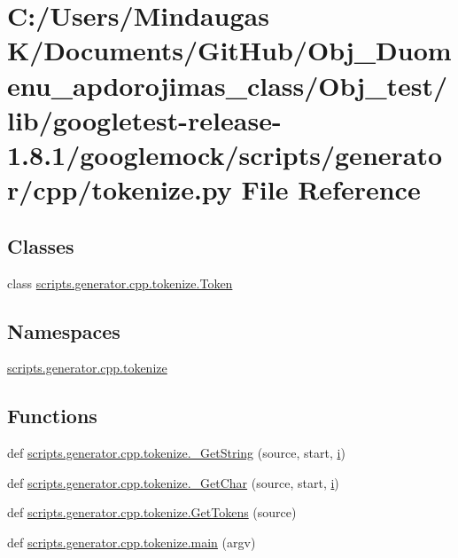 \hypertarget{_obj__test_2lib_2googletest-release-1_88_81_2googlemock_2scripts_2generator_2cpp_2tokenize_8py}{}\section{C\+:/\+Users/\+Mindaugas K/\+Documents/\+Git\+Hub/\+Obj\+\_\+\+Duomenu\+\_\+apdorojimas\+\_\+class/\+Obj\+\_\+test/lib/googletest-\/release-\/1.8.1/googlemock/scripts/generator/cpp/tokenize.py File Reference}
\label{_obj__test_2lib_2googletest-release-1_88_81_2googlemock_2scripts_2generator_2cpp_2tokenize_8py}
\subsection*{Classes}
\begin{DoxyCompactItemize}
\item 
class \mbox{\hyperlink{classscripts_1_1generator_1_1cpp_1_1tokenize_1_1_token}{scripts.\+generator.\+cpp.\+tokenize.\+Token}}
\end{DoxyCompactItemize}
\subsection*{Namespaces}
\begin{DoxyCompactItemize}
\item 
 \mbox{\hyperlink{namespacescripts_1_1generator_1_1cpp_1_1tokenize}{scripts.\+generator.\+cpp.\+tokenize}}
\end{DoxyCompactItemize}
\subsection*{Functions}
\begin{DoxyCompactItemize}
\item 
def \mbox{\hyperlink{namespacescripts_1_1generator_1_1cpp_1_1tokenize_a2fdc7cdc1c5bf1b4ac06a620b56da9a0}{scripts.\+generator.\+cpp.\+tokenize.\+\_\+\+Get\+String}} (source, start, \mbox{\hyperlink{_obj__test_2lib_2googletest-master_2googlemock_2test_2gmock-matchers__test_8cc_acb559820d9ca11295b4500f179ef6392}{i}})
\item 
def \mbox{\hyperlink{namespacescripts_1_1generator_1_1cpp_1_1tokenize_af68b9aec67dcebb9b919b7ec8a230d78}{scripts.\+generator.\+cpp.\+tokenize.\+\_\+\+Get\+Char}} (source, start, \mbox{\hyperlink{_obj__test_2lib_2googletest-master_2googlemock_2test_2gmock-matchers__test_8cc_acb559820d9ca11295b4500f179ef6392}{i}})
\item 
def \mbox{\hyperlink{namespacescripts_1_1generator_1_1cpp_1_1tokenize_a7821a660f6ba51a2b32ea9a3ec82e7f3}{scripts.\+generator.\+cpp.\+tokenize.\+Get\+Tokens}} (source)
\item 
def \mbox{\hyperlink{namespacescripts_1_1generator_1_1cpp_1_1tokenize_a3b3837ce41ee375dd016bb31ef6c052d}{scripts.\+generator.\+cpp.\+tokenize.\+main}} (argv)
\end{DoxyCompactItemize}
